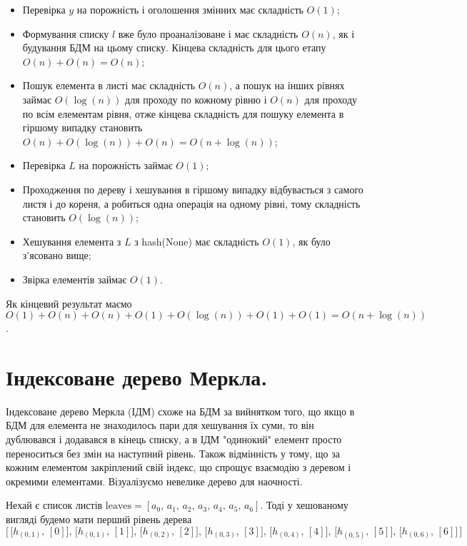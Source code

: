\documentclass[a4paper, 12pt]{article}
\begin{document}
\begin{itemize}
	\item Перевірка $y$ на порожність і оголошення змінних має складність $O(1)$;
	\item Формування списку $l$ вже було проаналізоване і має складність $O(n)$, як і будування БДМ на цьому списку. Кінцева складність для цього етапу $O(n) + O(n) = O(n)$;
	\item Пошук елемента в листі має складність $O(n)$, а пошук на інших рівнях займає $O(\log(n))$ для проходу по кожному рівню і $O(n)$ для проходу по всім елементам рівня, отже кінцева складність для пошуку елемента в гіршому випадку становить $O(n) + O(\log(n)) + O(n) = O(n + \log(n))$;
	\item Перевірка $L$ на порожність займає $O(1)$;
	\item Проходження по дереву і хешування в гіршому випадку відбувається з самого листя і до кореня, а робиться одна операція на одному рівні, тому складність становить $O(\log(n))$;
	\item Хешування елемента з $L$ з hash(None) має складність $O(1)$, як було з'ясовано вище;
	\item Звірка елементів займає $O(1)$.
\end{itemize}
\par Як кінцевий результат маємо $O(1) + O(n) + O(n) + O(1) + O(\log(n)) + O(1) + O(1) = O(n + \log(n))$.


\section{Індексоване дерево Меркла.}
\par Індексоване дерево Меркла (ІДМ) схоже на БДМ за вийнятком того, що якщо в БДМ для елемента не знаходилось пари для хешування їх суми, то він дублювався і додавався в кінець списку, а в ІДМ "одинокий" елемент просто переноситься без змін на наступний рівень. Також відмінність у тому, що за кожним елементом закріплений свій індекс, що спрощує взаємодію з деревом і окремими елементами. Візуалізуємо невелике дерево для наочності.

\par Нехай є список листів $\text{leaves} = [a_0, \, a_1, \, a_2, \, a_3, \, a_4, \, a_5, \, a_6]$. Тоді у хешованому вигляді будемо мати перший рівень дерева 
\[\Big[ \, \big[h_{(0, 1)},\, [0]\big],\, \big[h_{(0, 1)},\, [1]\big],\, \big[h_{(0, 2)},\, [2]\big],\, \big[h_{(0, 3)},\, [3]\big],\, \big[h_{(0, 4)},\, [4]\big],\, \big[h_{(0, 5)},\, [5]\big],\, \big[h_{(0, 6)},\, [6]\big] \,\Big]\]
\end{document}

